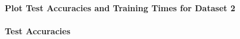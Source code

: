 \documentclass[11pt]{article}
\begin{document}
    \begin{center}
    \end{center}
    { \hspace*{\fill} \\}
    
    \hypertarget{plot-test-accuracies-and-training-times-for-dataset-2}{%
\paragraph{Plot Test Accuracies and Training Times for Dataset
2}\label{plot-test-accuracies-and-training-times-for-dataset-2}}

    \hypertarget{test-accuracies}{%
\paragraph{Test Accuracies}\label{test-accuracies}}
\end{document}
